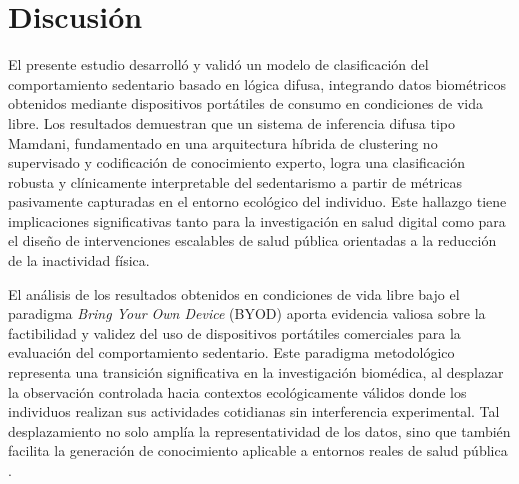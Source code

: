 
\chapter{Discusión}
\label{cap:discusion}


El presente estudio desarrolló y validó un modelo de clasificación del comportamiento sedentario basado en lógica difusa, integrando datos biométricos obtenidos mediante dispositivos portátiles de consumo en condiciones de vida libre. Los resultados demuestran que un sistema de inferencia difusa tipo Mamdani, fundamentado en una arquitectura híbrida de clustering no supervisado y codificación de conocimiento experto, logra una clasificación robusta y clínicamente interpretable del sedentarismo a partir de métricas pasivamente capturadas en el entorno ecológico del individuo. Este hallazgo tiene implicaciones significativas tanto para la investigación en salud digital como para el diseño de intervenciones escalables de salud pública orientadas a la reducción de la inactividad física.

El análisis de los resultados obtenidos en condiciones de vida libre bajo el paradigma \textit{Bring Your Own Device} (BYOD) aporta evidencia valiosa sobre la factibilidad y validez del uso de dispositivos portátiles comerciales para la evaluación del comportamiento sedentario. Este paradigma metodológico representa una transición significativa en la investigación biomédica, al desplazar la observación controlada hacia contextos ecológicamente válidos donde los individuos realizan sus actividades cotidianas sin interferencia experimental. Tal desplazamiento no solo amplía la representatividad de los datos, sino que también facilita la generación de conocimiento aplicable a entornos reales de salud pública \cite{Doherty2021,Liu2022}.

